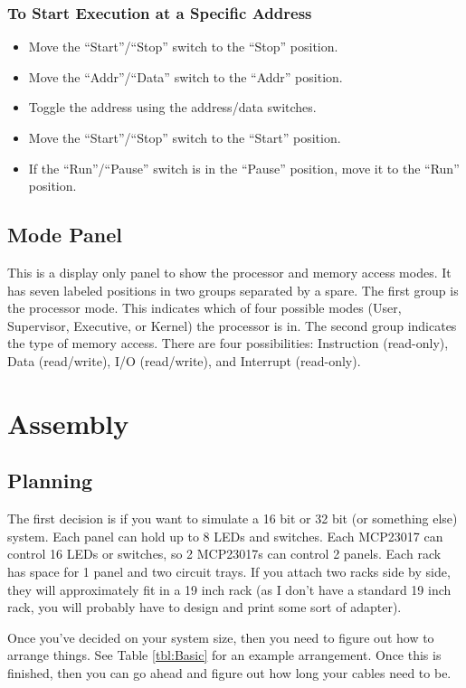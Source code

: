 \documentclass[10pt, openany]{book}
\newcommand{\switch}[2]{``#1''/``#2''}
\newcommand{\position}[1]{``#1''}
\begin{document}
\subsubsection{To Start Execution at a Specific Address}
\begin{itemize}
  \item Move the \switch{Start}{Stop} switch to the \position{Stop} position.
  \item Move the \switch{Addr}{Data} switch to the \position{Addr} position.
  \item Toggle the address using the address/data switches.
  \item Move the \switch{Start}{Stop} switch to the \position{Start} position.
  \item If the \switch{Run}{Pause} switch is in the \position{Pause} position, move it to the \position{Run} position.
\end{itemize}

\subsection{Mode Panel}
This is a display only panel to show the processor and memory access modes.  It has seven labeled positions in two groups separated by a spare.  The first group is the processor mode.  This indicates which of four possible modes (User, Supervisor, Executive, or Kernel) the processor is in.  The second group indicates the type of memory access.  There are four possibilities: Instruction (read-only), Data (read/write), I/O (read/write), and Interrupt (read-only).

\section{Assembly}

\subsection{Planning}
The first decision is if you want to simulate a 16 bit or 32 bit (or something else) system.  Each panel can hold up to 8 LEDs and switches.  Each MCP23017 can control 16 LEDs or switches, so 2 MCP23017s can control 2 panels.  Each rack has space for 1 panel and two circuit trays.  If you attach two racks side by side, they will approximately fit in a 19 inch rack (as I don't have a standard 19 inch rack, you will probably have to design and print some sort of adapter).

Once you've decided on your system size, then you need to figure out how to arrange things.  See Table \ref{tbl:Basic} for an example arrangement.  Once this is finished, then you can go ahead and figure out how long your cables need to be.
\end{document}
